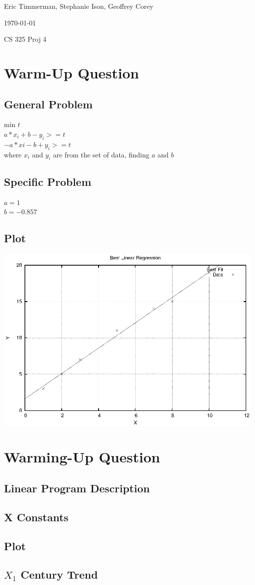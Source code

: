 \documentclass[letterpaper,10pt,titlepage]{article}
\def\name{Eric Timmerman, Stephanie Ison, Geoffrey Corey}
\begin{document}
\hfill \name

\hfill \today

\hfill CS 325 Proj 4

\section{Warm-Up Question}
\subsection*{General Problem}
min $t$\\
$a*x_{i} + b - y_{i} >= t$\\
$-a*x{i} - b + y_{i} >= t$\\
where $x_{i}$ and $y_{i}$ are from the set of data, finding $a$ and $b$
\subsection*{Specific Problem}
$a = 1$\\
$b = -0.857$

\subsection*{Plot}
\includegraphics[width=\textwidth]{warmup.eps}

\section{Warming-Up Question}
\subsection*{Linear Program Description}
\subsection*{X Constants}
\subsection*{Plot}
\subsection*{$X_{1}$ Century Trend}
\end{document}

